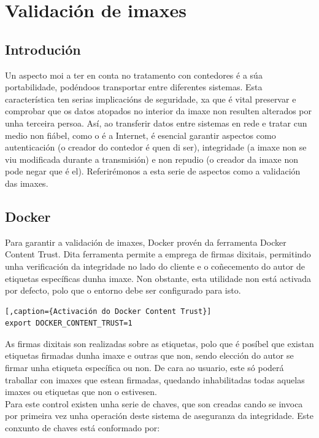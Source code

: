 \chapter{Validación de imaxes}
\minitoc
\clearpage

\section{Introdución}

Un aspecto moi a ter en conta no tratamento con contedores é a súa portabilidade, podéndoos transportar entre diferentes sistemas. Esta característica ten serias implicacións de seguridade, xa que é vital preservar e comprobar que os datos atopados no interior da imaxe non resulten alterados por unha terceira persoa. Así, ao transferir datos entre sistemas en rede e tratar cun medio non fiábel, como o é a Internet, é esencial garantir aspectos como autenticación (o creador do contedor é quen di ser), integridade (a imaxe non se viu modificada durante a transmisión) e non repudio (o creador da imaxe non pode negar que é el). Referirémonos a esta serie de aspectos como a validación das imaxes.

\section{Docker}
\label{dockerContentTruste}

Para garantir a validación de imaxes, Docker provén da ferramenta Docker Content Trust. Dita ferramenta permite a emprega de firmas dixitais, permitindo unha verificación da integridade no lado do cliente e o coñecemento do autor de etiquetas específicas dunha imaxe. Non obstante, esta utilidade non está activada por defecto, polo que o entorno debe ser configurado para isto.

\begin{lstlisting}[,caption={Activación do Docker Content Trust}]
export DOCKER_CONTENT_TRUST=1
\end{lstlisting}

As firmas dixitais son realizadas sobre as etiquetas, polo que é posíbel que existan etiquetas firmadas dunha imaxe e outras que non, sendo elección do autor se firmar unha etiqueta específica ou non. De cara ao usuario, este só poderá traballar con imaxes que estean firmadas, quedando inhabilitadas todas aquelas imaxes ou etiquetas que non o estivesen.\\

Para este control existen unha serie de chaves, que son creadas cando se invoca por primeira vez unha operación deste sistema de aseguranza da integridade. Este conxunto de chaves está conformado por:

